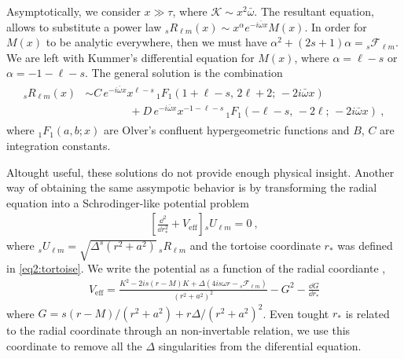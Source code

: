 Asymptotically, we consider $x\gg\tau$, where $\mathscr{K}\sim x^2 \bar{\omega}$. The resultant equation, 
allows to substitute a power law ${}_{s}R_{\ell m}(x)\sim x^\alpha e^{- i \bar{\omega} x} M(x)$. In order for $M(x)$ to be analytic everywhere, then we must have $\alpha^2+(2s+1)\alpha = {}_{s}\mathscr{F}_{\ell m}$. We are left with Kummer's differential equation for $M(x)$, where $\alpha = \ell-s$ or $\alpha=-1-\ell-s$. The general solution is the combination
\begin{align}
    \begin{split}
    {}_{s}R_{\ell m}(x) &\sim   C\,  e^{-i \bar{\omega} x} x^{\ell-s} \, {}_{1}F_1(1+\ell-s, \,2 \ell+2 ; \,-2 i \bar{\omega} x) \\
    &\qquad\qquad + D\,  e^{-i \bar{\omega} x} x^{-1-\ell-s} \, {}_{1}F_1(-\ell-s, \,-2 \ell; \,-2 i \bar{\omega} x) ~,
    \end{split}
    \label{eq3:RfarSolution}
\end{align}
where ${}_{1}F_1(a,b;x)$ are Olver's confluent hypergeometric functions and $B$, $C$ are integration constants.

Altought useful, these solutions do not provide enough physical insight. Another way of obtaining the same assympotic behavior is by transforming the radial equation into a Schrodinger-like potential problem
\begin{align}
    \label{eq3:D2PlusVeff}
    \left[ \frac{\dd^2}{\dd r_{*}^2} + V_\mathrm{eff} \right] {}_{s}U_{\ell m} = 0 ~,
\end{align}
where ${}_{s}U_{\ell m}=\sqrt{\Delta^s (r^2 + a^2)} \,{}_{s}R_{\ell m}$ and the tortoise coordinate $r_*$ was defined in \eqref{eq2:tortoise}.
We write the potential as a function of the radial coordiante \cite{Teukolsky1973a},
\begin{align}
    V_\mathrm{eff} = \frac{K^2 - 2 i s (r-M) K + \Delta ( 4 i s \omega r - {}_{s}\mathscr{F}_{\ell m} )}{(r^2+a^2)^2} - G^2 - \frac{\dd G}{\dd r_{*}}
\end{align}
where $G = s(r-M)/(r^2+a^2)+ r \Delta/(r^2+a^2)^2$.
Even tought $r_*$ is related to the radial coordinate through an non-invertable relation, we use this coordinate to remove all the $\Delta$ singularities from the diferential equation. 

